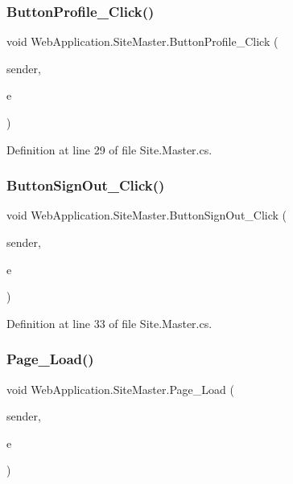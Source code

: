 \subsubsection{\texorpdfstring{ButtonProfile\_Click()}{ButtonProfile\_Click()}}
{\footnotesize\ttfamily void Web\+Application.\+Site\+Master.\+Button\+Profile\+\_\+\+Click (\begin{DoxyParamCaption}\item[{object}]{sender,  }\item[{Event\+Args}]{e }\end{DoxyParamCaption})\hspace{0.3cm}{\ttfamily [protected]}}



Definition at line 29 of file Site.\+Master.\+cs.

\mbox{\label{classWebApplication_1_1SiteMaster_ac4ef9b7a8418e64628e7301d7e2f4ac5}} 
\subsubsection{\texorpdfstring{ButtonSignOut\_Click()}{ButtonSignOut\_Click()}}
{\footnotesize\ttfamily void Web\+Application.\+Site\+Master.\+Button\+Sign\+Out\+\_\+\+Click (\begin{DoxyParamCaption}\item[{object}]{sender,  }\item[{Event\+Args}]{e }\end{DoxyParamCaption})\hspace{0.3cm}{\ttfamily [protected]}}



Definition at line 33 of file Site.\+Master.\+cs.

\mbox{\label{classWebApplication_1_1SiteMaster_af0e97c0a323fbba69b667fd6a11a9c53}} 
\subsubsection{\texorpdfstring{Page\_Load()}{Page\_Load()}}
{\footnotesize\ttfamily void Web\+Application.\+Site\+Master.\+Page\+\_\+\+Load (\begin{DoxyParamCaption}\item[{object}]{sender,  }\item[{Event\+Args}]{e }\end{DoxyParamCaption})\hspace{0.3cm}{\ttfamily [protected]}}



